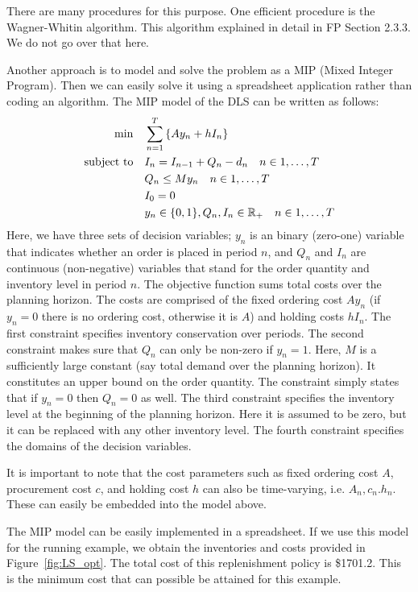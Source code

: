 \begin{solution}
There are many procedures for this purpose. One efficient procedure is the Wagner-Whitin algorithm. This algorithm explained in detail in FP Section 2.3.3. We do not go over that here.

Another approach is to model and solve the problem as a MIP (Mixed Integer Program). Then we can easily solve it using a spreadsheet application rather than coding an algorithm. The MIP model of the DLS can be written as follows:
\begin{align*}
\min\quad 
	& \sum_{n=1}^T \left\{Ay_n + hI_n\right\} \\
\operatorname*{\operatorname{subject}\,\operatorname{to}}\quad
	& I_n = I_{n-1} + Q_n - d_n \quad n\in 1,\ldots,T \\
	& Q_n \leq M y_n \quad n\in 1,\ldots,T \\
	& I_0 = 0 \\
	& y_n \in \{0,1\}, Q_n, I_n \in \mathbb{R}_+ \quad n\in 1,\ldots,T
\end{align*}
Here, we have three sets of decision variables; $y_n$ is an binary (zero-one) variable that indicates whether an order is placed in period $n$, and $Q_n$ and $I_n$ are continuous (non-negative) variables that stand for the order quantity and inventory level in period $n$. The objective function sums total costs over the planning horizon. The costs are comprised of the fixed ordering cost $Ay_n$ (if $y_n=0$ there is no ordering cost, otherwise it is $A$) and holding costs $hI_n$. The first constraint specifies inventory conservation over periods. The second constraint makes sure that $Q_n$ can only be non-zero if $y_n=1$. Here, $M$ is a sufficiently large constant (say total demand over the planning horizon). It constitutes an upper bound on the order quantity. The constraint simply states that if $y_n=0$ then $Q_n=0$ as well. The third constraint specifies the inventory level at the beginning of the planning horizon. Here it is assumed to be zero, but it can be replaced with any other inventory level. The fourth constraint specifies the domains of the decision variables.

It is important to note that the cost parameters such as fixed ordering cost $A$, procurement cost $c$, and holding cost $h$ can also be time-varying, i.e. $A_n,c_n.h_n$. These can easily be embedded into the model above.

The MIP model can be easily implemented in a spreadsheet. If we use this model for the running example, we obtain the inventories and costs provided in Figure~\ref{fig:LS_opt}. The total cost of this replenishment policy is \$1701.2. This is the minimum cost that can possible be attained for this example.


\end{solution}

